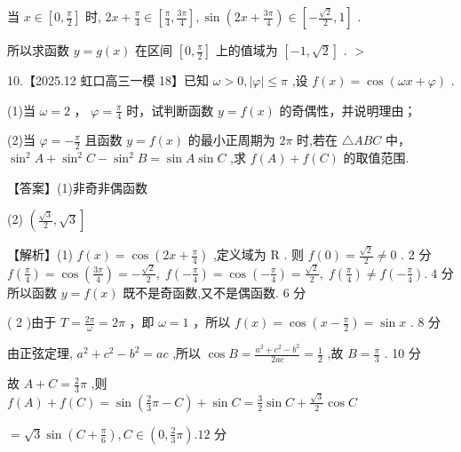 \documentclass[10pt]{article}
\begin{document}
当 \(x \in  \left\lbrack  {0,\frac{\pi }{2}}\right\rbrack\) 时, \({2x} + \frac{\pi }{4} \in  \left\lbrack  {\frac{\pi }{4},\frac{3\pi }{4}}\right\rbrack  ,\sin \left( {{2x} + \frac{3\pi }{4}}\right)  \in  \left\lbrack  {-\frac{\sqrt{2}}{2},1}\right\rbrack\) .

所以求函数 \(y = g\left( x\right)\) 在区间 \(\left\lbrack  {0,\frac{\pi }{2}}\right\rbrack\) 上的值域为 \(\left\lbrack  {-1,\sqrt{2}}\right\rbrack\) . \(>\)

10.【2025.12 虹口高三一模 18】已知 \(\omega  > 0,\left| \varphi \right|  \leq  \pi\) ,设 \(f\left( x\right)  = \cos \left( {{\omega x} + \varphi }\right)\) .

(1)当 \(\omega  = 2\) ， \(\varphi  = \frac{\pi }{4}\) 时，试判断函数 \(y = f\left( x\right)\) 的奇偶性，并说明理由；

(2)当 \(\varphi  =  - \frac{\pi }{2}\) 且函数 \(y = f\left( x\right)\) 的最小正周期为 \({2\pi }\) 时,若在 \(\bigtriangleup  {ABC}\) 中， \({\sin }^{2}A + {\sin }^{2}C - {\sin }^{2}B = \sin A\sin C\) ,求 \(f\left( A\right)  + f\left( C\right)\) 的取值范围.

【答案】(1)非奇非偶函数

(2) \(\left( {\frac{\sqrt{3}}{2},\sqrt{3}}\right\rbrack\)

【解析】(1) \(f\left( x\right)  = \cos \left( {{2x} + \frac{\pi }{4}}\right)\) ,定义域为 \(\mathrm{R}\) . 则 \(f\left( 0\right)  = \frac{\sqrt{2}}{2} \neq  0\) . 2 分 \(f\left( \frac{\pi }{4}\right)  = \cos \left( \frac{3\pi }{4}\right)  =  - \frac{\sqrt{2}}{2},\;f\left( {-\frac{\pi }{4}}\right)  = \cos \left( {-\frac{\pi }{4}}\right)  = \frac{\sqrt{2}}{2},\;f\left( \frac{\pi }{4}\right)  \neq  f\left( {-\frac{\pi }{4}}\right) .\;4\) 分所以函数 \(y = f\left( x\right)\) 既不是奇函数,又不是偶函数. 6 分

( 2 )由于 \(T = \frac{2\pi }{\omega } = {2\pi }\) ，即 \(\omega  = 1\) ，所以 \(f\left( x\right)  = \cos \left( {x - \frac{\pi }{2}}\right)  = \sin x\) . 8 分

由正弦定理, \({a}^{2} + {c}^{2} - {b}^{2} = {ac}\) ,所以 \(\cos B = \frac{{a}^{2} + {c}^{2} - {b}^{2}}{2ac} = \frac{1}{2}\) ,故 \(B = \frac{\pi }{3}\) . 10 分

故 \(A + C = \frac{2}{3}\pi\) ,则 \(f\left( A\right)  + f\left( C\right)  = \sin \left( {\frac{2}{3}\pi  - C}\right)  + \sin C = \frac{3}{2}\sin C + \frac{\sqrt{3}}{2}\cos C\)

\(= \sqrt{3}\sin \left( {C + \frac{\pi }{6}}\right) ,C \in  \left( {0,\frac{2}{3}\pi }\right) .{12}\) 分
\end{document}
